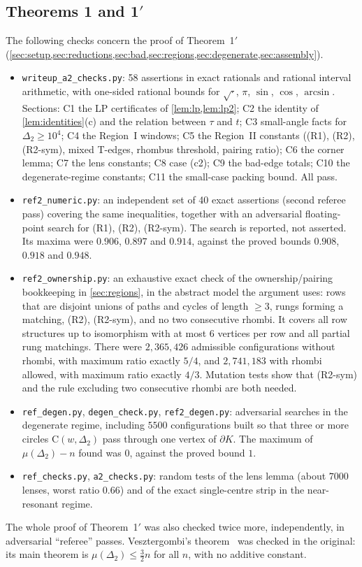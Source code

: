 \documentclass[11pt]{amsart}
\theoremstyle{definition}
\theoremstyle{remark}
\newcommand{\Dt}{\Delta_2}
\newcommand{\mult}{\mu}
\newcommand{\Cc}{\mathrm{C}}      %
\begin{document}
\subsection*{Theorems 1 and 1\texorpdfstring{$'$}{'}}
The following checks concern the proof of Theorem~1$'$ (\cref{sec:setup,sec:reductions,sec:bad,sec:regions,sec:degenerate,sec:assembly}).
\begin{itemize}[leftmargin=2em]
\item \texttt{writeup\_a2\_checks.py}: 58 assertions in exact rationals and rational interval arithmetic, with one-sided rational bounds for $\sqrt{\cdot}$, $\pi$, $\sin$, $\cos$, $\arcsin$. Sections: C1 the LP certificates of \cref{lem:lp,lem:lp2}; C2 the identity of \cref{lem:identities}(c) and the relation between $\tau$ and $t$; C3 small-angle facts for $\Dt\ge10^4$; C4 the Region~I windows; C5 the Region~II constants ((R1), (R2), (R2-sym), mixed T-edges, rhombus threshold, pairing ratio); C6 the corner lemma; C7 the lens constants; C8 case (c2); C9 the bad-edge totals; C10 the degenerate-regime constants; C11 the small-case packing bound. All pass.
\item \texttt{ref2\_numeric.py}: an independent set of 40 exact assertions (second referee pass) covering the same inequalities, together with an adversarial floating-point search for (R1), (R2), (R2-sym). The search is reported, not asserted. Its maxima were $0.906$, $0.897$ and $0.914$, against the proved bounds $0.908$, $0.918$ and $0.948$.
\item \texttt{ref2\_ownership.py}: an exhaustive exact check of the ownership/pairing bookkeeping in \cref{sec:regions}, in the abstract model the argument uses: rows that are disjoint unions of paths and cycles of length $\ge3$, rungs forming a matching, (R2), (R2-sym), and no two consecutive rhombi. It covers all row structures up to isomorphism with at most $6$ vertices per row and all partial rung matchings. There were $2{,}365{,}426$ admissible configurations without rhombi, with maximum ratio exactly $5/4$, and $2{,}741{,}183$ with rhombi allowed, with maximum ratio exactly $4/3$. Mutation tests show that (R2-sym) and the rule excluding two consecutive rhombi are both needed.
\item \texttt{ref\_degen.py}, \texttt{degen\_check.py}, \texttt{ref2\_degen.py}: adversarial searches in the degenerate regime, including $5500$ configurations built so that three or more circles $\Cc(w,\Dt)$ pass through one vertex of $\partial K$. The maximum of $\mult(\Dt)-n$ found was $0$, against the proved bound $1$.
\item \texttt{ref\_checks.py}, \texttt{a2\_checks.py}: random tests of the lens lemma (about $7000$ lenses, worst ratio $0.66$) and of the exact single-centre strip in the near-resonant regime.
\end{itemize}
The whole proof of Theorem~1$'$ was also checked twice more, independently, in adversarial ``referee'' passes. Vesztergombi's theorem~\cite{Ve87} was checked in the original: its main theorem is $\mult(\Dt)\le\frac32n$ for all $n$, with no additive constant.
\end{document}
